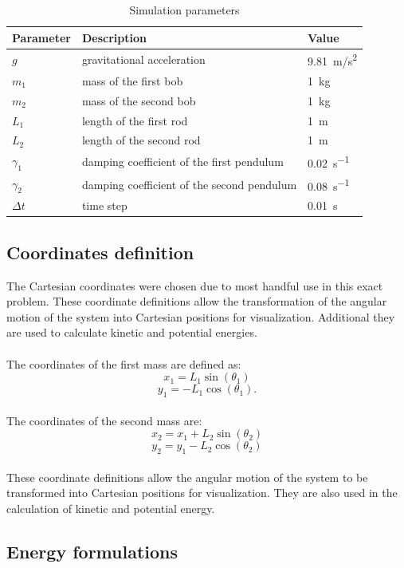 \documentclass[12pt,a4paper]{article}
\begin{document}
\begin{table}[H]
\centering
\caption{Simulation parameters}
\label{tab:system_parameters}
\begin{tabular}{lll}
\toprule
Parameter & Description & Value \\
\midrule
$g$ & gravitational acceleration & \SI{9.81}{m/s^2} \\
$m_1$ & mass of the first bob & \SI{1}{kg} \\
$m_2$ & mass of the second bob & \SI{1}{kg} \\
$L_1$ & length of the first rod & \SI{1}{m} \\
$L_2$ & length of the second rod & \SI{1}{m} \\
$\gamma_1$ & damping coefficient of the first pendulum & \SI{0.02}{s^{-1}} \\
$\gamma_2$ & damping coefficient of the second pendulum & \SI{0.08}{s^{-1}} \\
$\Delta t$ & time step & \SI{0.01}{s} \\
\bottomrule
\end{tabular}
\end{table}

\subsection{Coordinates definition}

The Cartesian coordinates were chosen due to most handful use in this exact problem. These coordinate definitions allow the transformation of the angular motion of the system into Cartesian positions for visualization. Additional they are used to calculate kinetic and potential energies.
\\\\
The coordinates of the first mass are defined as:
\[x_1 = L_1 \sin(\theta_1)\] \[y_1 = -L_1 \cos(\theta_1).\]\\
The coordinates of the second mass are:
\[x_2 = x_1 + L_2 \sin(\theta_2)\] \[y_2 = y_1 - L_2 \cos(\theta_2)\]\\
These coordinate definitions allow the angular motion of the system to be transformed into Cartesian positions for visualization. They are also used in the calculation of kinetic and potential energy.

\subsection{Energy formulations}
\end{document}
